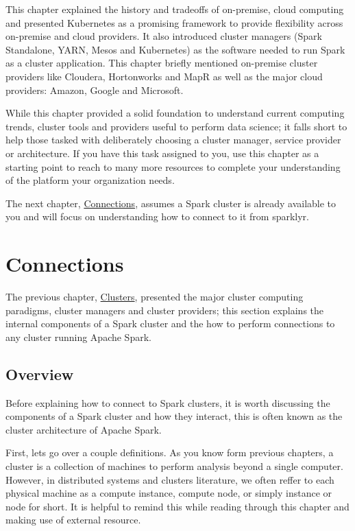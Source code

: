 \documentclass[]{book}
\theoremstyle{definition}
\theoremstyle{definition}
\theoremstyle{definition}
\theoremstyle{remark}
\begin{document}
This chapter explained the history and tradeoffs of on-premise, cloud
computing and presented Kubernetes as a promising framework to provide
flexibility across on-premise and cloud providers. It also introduced
cluster managers (Spark Standalone, YARN, Mesos and Kubernetes) as the
software needed to run Spark as a cluster application. This chapter
briefly mentioned on-premise cluster providers like Cloudera,
Hortonworks and MapR as well as the major cloud providers: Amazon,
Google and Microsoft.

While this chapter provided a solid foundation to understand current
computing trends, cluster tools and providers useful to perform data
science; it falls short to help those tasked with deliberately choosing
a cluster manager, service provider or architecture. If you have this
task assigned to you, use this chapter as a starting point to reach to
many more resources to complete your understanding of the platform your
organization needs.

The next chapter, \protect\hyperlink{connections-1}{Connections},
assumes a Spark cluster is already available to you and will focus on
understanding how to connect to it from sparklyr.

\hypertarget{connections}{%
\chapter{Connections}\label{connections}}

The previous chapter, \protect\hyperlink{clusters}{Clusters}, presented
the major cluster computing paradigms, cluster managers and cluster
providers; this section explains the internal components of a Spark
cluster and the how to perform connections to any cluster running Apache
Spark.

\hypertarget{overview-2}{%
\section{Overview}\label{overview-2}}

Before explaining how to connect to Spark clusters, it is worth
discussing the components of a Spark cluster and how they interact, this
is often known as the cluster architecture of Apache Spark.

First, lets go over a couple definitions. As you know form previous
chapters, a cluster is a collection of machines to perform analysis
beyond a single computer. However, in distributed systems and clusters
literature, we often reffer to each physical machine as a compute
instance, compute node, or simply instance or node for short. It is
helpful to remind this while reading through this chapter and making use
of external resource.
\end{document}
